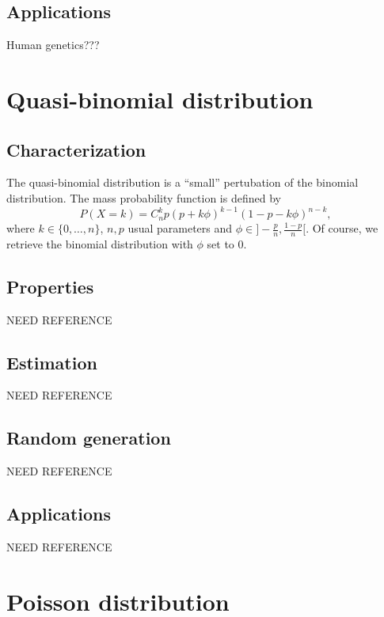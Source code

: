 \subsection{Applications}
Human genetics???

\section{Quasi-binomial distribution}
\subsection{Characterization}
The quasi-binomial distribution is a ``small'' pertubation of the binomial distribution. The mass probability function is defined by
$$
P(X=k) = C_n^k p(p+k\phi)^{k-1}(1-p-k\phi)^{n-k},
$$
where $k\in \{0,\dots, n\}$, $n,p$ usual parameters and $\phi\in]-\frac{p}{n},\frac{1-p}{n}[$. Of course, we retrieve the binomial distribution with $\phi$ set to 0.

\subsection{Properties}
NEED REFERENCE
\subsection{Estimation}
NEED REFERENCE
\subsection{Random generation}
NEED REFERENCE
\subsection{Applications}
NEED REFERENCE

\section{Poisson distribution}
